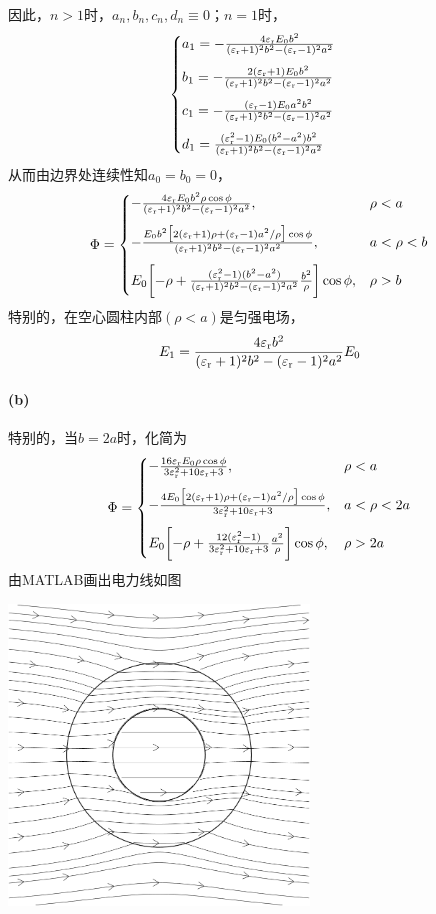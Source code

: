 因此，$n>1$时，$a_n,b_n,c_n,d_n\equiv 0$；$n=1$时， 
\begin{equation}
    \begin{cases}
        a_1=-\frac{4\varepsilon_\text r E_0b^2}{(\varepsilon_\text r+1)^2b^2-(\varepsilon_\text r-1)^2a^2}\\[2ex]
        b_1=-\frac{2(\varepsilon_\text r+1)E_0b^2}{(\varepsilon_\text r+1)^2b^2-(\varepsilon_\text r-1)^2a^2}\\[2ex]
        c_1=-\frac{(\varepsilon_\text r-1)E_0a^2b^2}{(\varepsilon_\text r+1)^2b^2-(\varepsilon_\text r-1)^2a^2}\\[2ex]
        d_1=\frac{(\varepsilon_\text r^2-1)E_0(b^2-a^2)b^2}{(\varepsilon_\text r+1)^2b^2-(\varepsilon_\text r-1)^2a^2}
    \end{cases}
\end{equation}
从而由边界处连续性知$a_0=b_0=0$，
\begin{equation}
    \Phi=\begin{cases}
        -\frac{4\varepsilon_\text r E_0b^2\rho\cos\phi}{(\varepsilon_\text r+1)^2b^2-(\varepsilon_\text r-1)^2a^2},&\rho<a\\[2ex]
        -\frac{E_0b^2\bigl[2(\varepsilon_\text r+1)\rho+(\varepsilon_\text r-1)a^2/\rho\bigr]\cos\phi}{(\varepsilon_\text r+1)^2b^2-(\varepsilon_\text r-1)^2a^2},&a<\rho<b\\[2ex]
        E_0\biggl[-\rho+\frac{(\varepsilon_\text r^2-1)(b^2-a^2)}{(\varepsilon_\text r+1)^2b^2-(\varepsilon_\text r-1)^2a^2}\frac{b^2}\rho\biggr]\cos\phi,&\rho>b
    \end{cases}
\end{equation}
特别的，在空心圆柱内部$(\rho<a)$是匀强电场，
\begin{equation}
    E_1=\frac{4\varepsilon_\text r b^2}{(\varepsilon_\text r+1)^2b^2-(\varepsilon_\text r-1)^2a^2}E_0
\end{equation}
\paragraph{(b)}
特别的，当$b=2a$时，化简为
\begin{equation}
    \Phi=\begin{cases}
        -\frac{16\varepsilon_\text r E_0\rho\cos\phi}{3\varepsilon_\text r^2+10\varepsilon_\text r+3},&\rho<a\\[2ex]
        -\frac{4E_0\bigl[2(\varepsilon_\text r+1)\rho+(\varepsilon_\text r-1)a^2/\rho\bigr]\cos\phi}{3\varepsilon_\text r^2+10\varepsilon_\text r+3},&a<\rho<2a\\[2ex]
        E_0\biggl[-\rho+\frac{12(\varepsilon_\text r^2-1)}{3\varepsilon_\text r^2+10\varepsilon_\text r+3}\frac{a^2}\rho\biggr]\cos\phi,&\rho>2a
    \end{cases}
\end{equation}
由MATLAB画出电力线如图
\begin{center}
    \includegraphics[width=8cm]{E.png}
\end{center}
